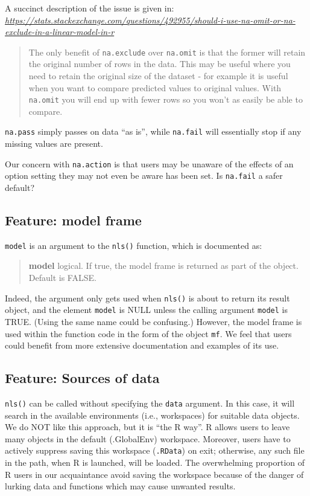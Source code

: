 \documentclass[
]{article}
\begin{document}
A succinct description of the issue is given in:
\emph{\url{https://stats.stackexchange.com/questions/492955/should-i-use-na-omit-or-na-exclude-in-a-linear-model-in-r}}

\begin{quote}
The only benefit of \texttt{na.exclude} over \texttt{na.omit} is that
the former will retain the original number of rows in the data. This may
be useful where you need to retain the original size of the dataset -
for example it is useful when you want to compare predicted values to
original values. With \texttt{na.omit} you will end up with fewer rows
so you won't as easily be able to compare.
\end{quote}

\texttt{na.pass} simply passes on data ``as is'', while \texttt{na.fail}
will essentially stop if any missing values are present.

Our concern with \texttt{na.action} is that users may be unaware of the
effects of an option setting they may not even be aware has been set. Is
\texttt{na.fail} a safer default?

\hypertarget{feature-model-frame}{%
\subsection{Feature: model frame}\label{feature-model-frame}}

\texttt{model} is an argument to the \texttt{nls()} function, which is
documented as:

\begin{quote}
\textbf{model} logical. If true, the model frame is returned as part of
the object. Default is FALSE.
\end{quote}

Indeed, the argument only gets used when \texttt{nls()} is about to
return its result object, and the element \texttt{model} is NULL unless
the calling argument \texttt{model} is TRUE. (Using the same name could
be confusing.) However, the model frame is used within the function code
in the form of the object \texttt{mf}. We feel that users could benefit
from more extensive documentation and examples of its use.

\hypertarget{feature-sources-of-data}{%
\subsection{Feature: Sources of data}\label{feature-sources-of-data}}

\texttt{nls()} can be called without specifying the \texttt{data}
argument. In this case, it will search in the available environments
(i.e., workspaces) for suitable data objects. We do NOT like this
approach, but it is ``the R way''. R allows users to leave many objects
in the default (.GlobalEnv) workspace. Moreover, users have to actively
suppress saving this workspace (\texttt{.RData}) on exit; otherwise, any
such file in the path, when R is launched, will be loaded. The
overwhelming proportion of R users in our acquaintance avoid saving the
workspace because of the danger of lurking data and functions which may
cause unwanted results.
\end{document}
